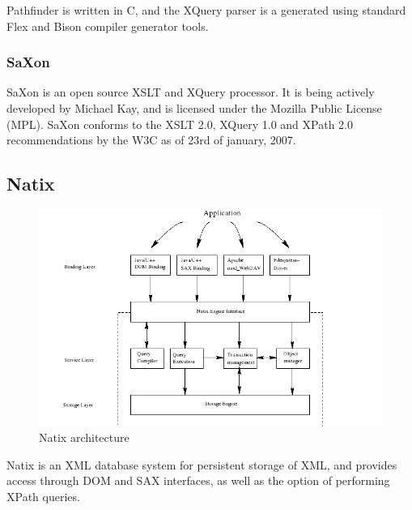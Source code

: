 Pathfinder is written in C, and the XQuery parser is a generated using standard Flex and Bison compiler generator tools.

\subsubsection{SaXon}
SaXon is an open source XSLT and XQuery processor. It is being actively developed by Michael Kay, and is licensed under the Mozilla Public License (MPL). SaXon conforms to the XSLT 2.0, XQuery 1.0 and XPath 2.0 recommendations by the W3C as of 23rd of january, 2007.

\subsection{Natix}
\begin{figure}[!h]
  \centering
    \includegraphics[width=1\textwidth]{img/natix_architecture.png}
  \caption{Natix architecture}
\end{figure}
Natix is an XML database system for persistent storage of XML, and provides access through DOM and SAX interfaces, as well as the option of performing XPath queries.